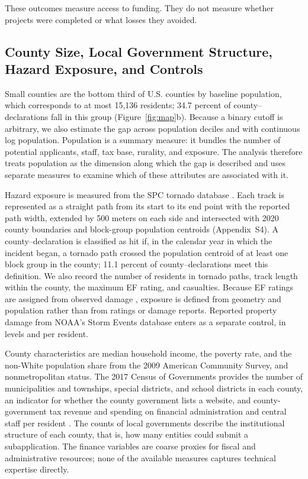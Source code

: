 These outcomes measure access to funding. They do not measure whether projects were completed or what losses they avoided.

\subsection{County Size, Local Government Structure, Hazard Exposure, and Controls}

Small counties are the bottom third of U.S. counties by baseline population, which corresponds to at most 15,136 residents; 34.7 percent of county--declarations fall in this group (Figure~\ref{fig:map}b). Because a binary cutoff is arbitrary, we also estimate the gap across population deciles and with continuous log population. Population is a summary measure: it bundles the number of potential applicants, staff, tax base, rurality, and exposure. The analysis therefore treats population as the dimension along which the gap is described and uses separate measures to examine which of these attributes are associated with it.

Hazard exposure is measured from the SPC tornado database \parencite{spc2025database}. Each track is represented as a straight path from its start to its end point with the reported path width, extended by 500 meters on each side and intersected with 2020 county boundaries and block-group population centroids (Appendix~S4). A county--declaration is classified as hit if, in the calendar year in which the incident began, a tornado path crossed the population centroid of at least one block group in the county; 11.1 percent of county--declarations meet this definition. We also record the number of residents in tornado paths, track length within the county, the maximum EF rating, and casualties. Because EF ratings are assigned from observed damage \parencite{doswell2009ef}, exposure is defined from geometry and population rather than from ratings or damage reports. Reported property damage from NOAA's Storm Events database enters as a separate control, in levels and per resident.

County characteristics are median household income, the poverty rate, and the non-White population share from the 2009 American Community Survey, and nonmetropolitan status. The 2017 Census of Governments provides the number of municipalities and townships, special districts, and school districts in each county, an indicator for whether the county government lists a website, and county-government tax revenue and spending on financial administration and central staff per resident \parencite{census2017cog}. The counts of local governments describe the institutional structure of each county, that is, how many entities could submit a subapplication. The finance variables are coarse proxies for fiscal and administrative resources; none of the available measures captures technical expertise directly.

